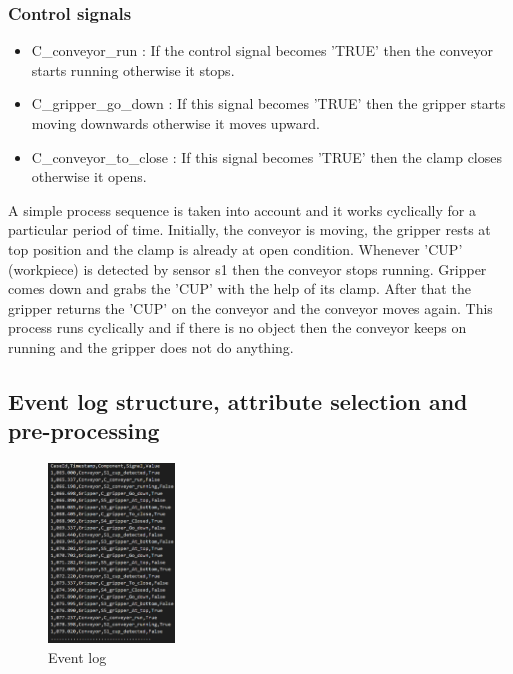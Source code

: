 \begin{bibunit}
   \subsubsection{Control signals}
   \begin{itemize}
	 \item C\_conveyor\_run : If the control signal becomes 'TRUE' then the conveyor starts running otherwise it stops.
	 \item  C\_gripper\_go\_down : If this signal becomes 'TRUE' then the gripper starts moving downwards otherwise it moves upward.
	 \item  C\_conveyor\_to\_close : If this signal becomes 'TRUE' then the clamp closes  otherwise it opens.
   \end{itemize}
   
   
   A simple process sequence is taken into account and it works cyclically for a particular period of time. Initially, the conveyor is moving, the gripper rests at top position and the clamp is already at open condition. Whenever 'CUP' (workpiece) is detected by sensor s1 then the conveyor stops running. Gripper comes down and grabs the 'CUP' with the help of its clamp. After that the gripper returns the 'CUP' on the conveyor and the conveyor moves again. This process runs cyclically and if there is no object then the conveyor keeps on running and the gripper does not do anything.
   
   \subsection{Event log structure, attribute selection and pre-processing}
   
   \begin{figure}[!t]
	   \centering
	   \includegraphics[width=0.3\textwidth]{MX_Papers/Paper5/images/EL.PNG}
	   \caption{Event log}
	   \label{fig:EL}
   \end{figure}
   

\end{bibunit}

